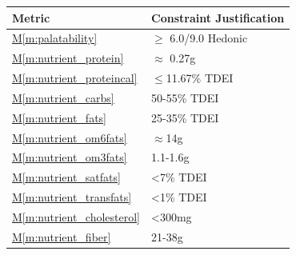 \documentclass{../tex/report}
\newcommand{\mref}[1]{\hyperref[#1]{M\ref{#1}}}
\begin{document}
\begin{tabular}{|l|p{14.35cm}|}
    \hline
    \textbf{Metric}                 & \textbf{Constraint                                                \hfill Justification}                                   \\ \hline
    \mref{m:palatability}           & $\ge$ 6.0/9.0 Hedonic                                             \hfill \cite{applicantguide,dsfc-phase2}                \\ \hline
    \mref{m:nutrient_protein}       & $\approx$ 0.27g                                                   \hfill \cite{applicantguide,dsfc-phase2,nutrition}      \\ \hline
    \mref{m:nutrient_proteincal}    & $\le$11.67\% TDEI                                                 \hfill \cite{applicantguide,dsfc-phase2,nutrition}      \\ \hline
    \mref{m:nutrient_carbs}         & 50-55\% TDEI                                                      \hfill \cite{applicantguide,dsfc-phase2,nutrition}      \\ \hline
    \mref{m:nutrient_fats}          & 25-35\% TDEI                                                      \hfill \cite{applicantguide,dsfc-phase2,nutrition}      \\ \hline
    \mref{m:nutrient_om6fats}       & $\approx$14g                                                      \hfill \cite{applicantguide,dsfc-phase2,nutrition}      \\ \hline
    \mref{m:nutrient_om3fats}       & 1.1-1.6g                                                          \hfill \cite{applicantguide,dsfc-phase2,nutrition}      \\ \hline
    \mref{m:nutrient_satfats}       & <7\% TDEI                                                         \hfill \cite{applicantguide,dsfc-phase2,nutrition}      \\ \hline
    \mref{m:nutrient_transfats}     & <1\% TDEI                                                         \hfill \cite{applicantguide,dsfc-phase2,nutrition}      \\ \hline
    \mref{m:nutrient_cholesterol}   & <300mg                                                            \hfill \cite{applicantguide,dsfc-phase2,nutrition}      \\ \hline
    \mref{m:nutrient_fiber}         & 21-38g                                                            \hfill \cite{applicantguide,dsfc-phase2,nutrition}      \\ \hline

\end{tabular}
\end{document}
